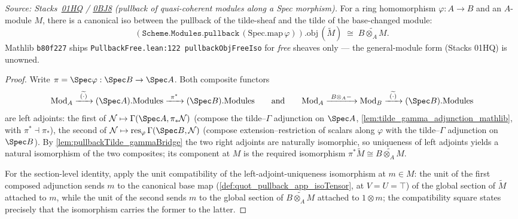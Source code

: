 \begin{lemma}
  \label{lem:pullback_tildeIso}
  \leanok
  \textit{Source: Stacks~\href{https://stacks.math.columbia.edu/tag/01HQ}{01HQ}
  / \href{https://stacks.math.columbia.edu/tag/0BJ8}{0BJ8} (pullback of
  quasi-coherent modules along a Spec morphism).}
  For a ring homomorphism \(\varphi : A \to B\) and an \(A\)-module
  \(M\), there is a canonical iso between the pullback of the
  tilde-sheaf and the tilde of the base-changed module:
  \[
    (\mathtt{Scheme.Modules.pullback}\, (\mathrm{Spec.map}\, \varphi)).\mathrm{obj}\,
      (\widetilde{M})
    \;\cong\;
    \widetilde{B \otimes_A M}.
  \]
  Mathlib \texttt{b80f227} ships
  \texttt{PullbackFree.lean:122 pullbackObjFreeIso} for \emph{free} sheaves
  only — the general-module form (Stacks 01HQ) is unowned.
\end{lemma}
\begin{proof}
  \leanok
  Write \(\pi = \Spec\varphi : \Spec B \to \Spec A\). Both composite
  functors
  \[
    \mathrm{Mod}_{A} \xrightarrow{\ \widetilde{(\cdot)}\ }
      (\Spec A).\mathrm{Modules} \xrightarrow{\ \pi^{*}\ }
      (\Spec B).\mathrm{Modules}
    \qquad\text{and}\qquad
    \mathrm{Mod}_{A} \xrightarrow{\ B \otimes_A -\ } \mathrm{Mod}_{B}
      \xrightarrow{\ \widetilde{(\cdot)}\ } (\Spec B).\mathrm{Modules}
  \]
  are left adjoints: the first of
  \(\mathcal N \mapsto \Gamma(\Spec A, \pi_{*}\mathcal N)\) (compose the
  tilde--\(\Gamma\) adjunction on \(\Spec A\),
  \cref{lem:tilde_gamma_adjunction_mathlib}, with
  \(\pi^{*} \dashv \pi_{*}\)), the second of
  \(\mathcal N \mapsto \mathrm{res}_{\varphi}\,\Gamma(\Spec B, \mathcal N)\)
  (compose extension--restriction of scalars along \(\varphi\) with the
  tilde--\(\Gamma\) adjunction on \(\Spec B\)). By
  \cref{lem:pullbackTilde_gammaBridge} the two right adjoints are
  naturally isomorphic, so uniqueness of left adjoints yields a natural
  isomorphism of the two composites; its component at \(M\) is the
  required isomorphism
  \(\pi^{*}\widetilde M \cong \widetilde{B \otimes_A M}\).

  For the section-level identity, apply the unit compatibility of the
  left-adjoint-uniqueness isomorphism at \(m \in M\): the unit of the
  first composed adjunction sends \(m\) to the canonical base map
  (\cref{def:quot_pullback_app_isoTensor}, at \(V = U = \top\)) of the
  global section of \(\widetilde M\) attached to \(m\), while the unit
  of the second sends \(m\) to the global section of
  \(\widetilde{B \otimes_A M}\) attached to \(1 \otimes m\); the
  compatibility square states precisely that the isomorphism carries
  the former to the latter.
\end{proof}

